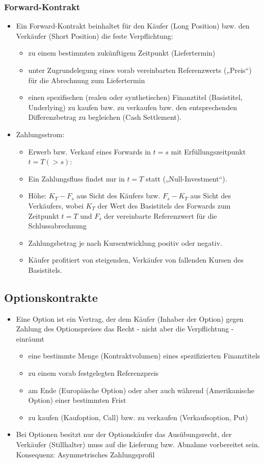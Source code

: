 \documentclass[12pt]{report}
\theoremstyle{dotless}
\theoremstyle{definition}
\begin{document}
\subsubsection{Forward-Kontrakt}
\begin{itemize}
\item Ein Forward-Kontrakt beinhaltet für den Käufer (Long Position) bzw. den
Verkäufer (Short Position) die feste Verpflichtung:
\begin{itemize}
\item zu einem bestimmten zukünftigem Zeitpunkt (Liefertermin)
\item unter Zugrundelegung eines vorab vereinbarten Referenzwerts („Preis“) für die
Abrechnung zum Liefertermin
\item einen spezifischen (realen oder synthetischen) Finanztitel (Basistitel,
Underlying) zu kaufen bzw. zu verkaufen bzw. den entsprechenden
Differenzbetrag zu begleichen (Cash Settlement).
\end{itemize}
\item Zahlungsstrom:
\begin{itemize}
\item Erwerb bzw. Verkauf eines Forwards in $t = s$ mit Erfüllungszeitpunkt
$t = T(> s)$:
\item Ein Zahlungsfluss findet nur in $t = T$ statt („Null-Investment“).
\item Höhe: $K_T - F_s$ aus Sicht des Käufers bzw. $F_s - K_T$ aus Sicht des Verkäufers, wobei $K_T$ der Wert des Basistitels des Forwards zum Zeitpunkt $t = T$ und $F_s$ der vereinbarte Referenzwert für die Schlussabrechnung
\item Zahlungsbetrag je nach Kursentwicklung positiv oder negativ.
\item Käufer profitiert von steigenden, Verkäufer von fallenden Kursen des Basistitels.
\end{itemize}
\end{itemize}


\subsection{Optionskontrakte}
\begin{itemize}
\item Eine Option ist ein Vertrag, der dem Käufer (Inhaber der Option) gegen
Zahlung des Optionspreises das Recht - nicht aber die Verpflichtung -
einräumt
\begin{itemize}
\item eine bestimmte Menge (Kontraktvolumen) eines spezifizierten Finanztitels
\item zu einem vorab festgelegten Referenzpreis
\item am Ende (Europäische Option) oder aber auch während (Amerikanische
Option) einer bestimmten Frist
\item zu kaufen (Kaufoption, Call) bzw. zu verkaufen (Verkaufsoption, Put)
\end{itemize}
\item Bei Optionen besitzt nur der Optionskäufer das Ausübungsrecht, der
Verkäufer (Stillhalter) muss auf die Lieferung bzw. Abnahme vorbereitet sein.
Konsequenz: Asymmetrisches Zahlungsprofil
\end{itemize}
\end{document}
